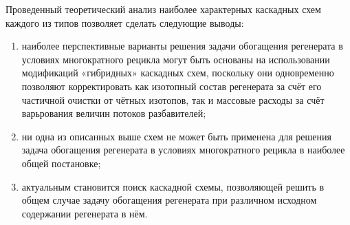 Проведенный теоретический анализ наиболее характерных каскадных схем каждого из типов позволяет сделать следующие выводы:
\begin{enumerate}
  \item наиболее перспективные варианты решения задачи обогащения регенерата в условиях многократного рецикла могут быть основаны на использовании модификаций «гибридных» каскадных схем, поскольку они одновременно позволяют корректировать как изотопный состав регенерата за счёт его частичной очистки от чётных изотопов, так и массовые расходы за счёт варьрования величин потоков разбавителей;
  \item ни одна из описанных выше схем не может быть применена для решения задача обогащения регенерата в условиях многократного рецикла в наиболее общей постановке;
  \item актуальным становится поиск каскадной схемы, позволяющей решить в общем случае задачу обогащения регенерата при различном исходном содержании регенерата в нём.
\end{enumerate}
